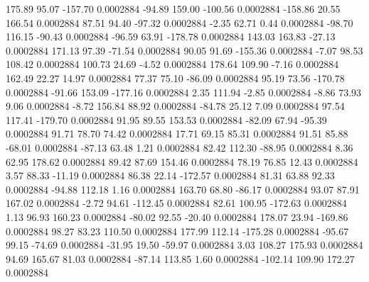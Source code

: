       175.89       95.07     -157.70     0.0002884
      -94.89      159.00     -100.56     0.0002884
     -158.86       20.55      166.54     0.0002884
       87.51       94.40      -97.32     0.0002884
       -2.35       62.71        0.44     0.0002884
      -98.70      116.15      -90.43     0.0002884
      -96.59       63.91     -178.78     0.0002884
      143.03      163.83      -27.13     0.0002884
      171.13       97.39      -71.54     0.0002884
       90.05       91.69     -155.36     0.0002884
       -7.07       98.53      108.42     0.0002884
      100.73       24.69       -4.52     0.0002884
      178.64      109.90       -7.16     0.0002884
      162.49       22.27       14.97     0.0002884
       77.37       75.10      -86.09     0.0002884
       95.19       73.56     -170.78     0.0002884
      -91.66      153.09     -177.16     0.0002884
        2.35      111.94       -2.85     0.0002884
       -8.86       73.93        9.06     0.0002884
       -8.72      156.84       88.92     0.0002884
      -84.78       25.12        7.09     0.0002884
       97.54      117.41     -179.70     0.0002884
       91.95       89.55      153.53     0.0002884
      -82.09       67.94      -95.39     0.0002884
       91.71       78.70       74.42     0.0002884
       17.71       69.15       85.31     0.0002884
       91.51       85.88      -68.01     0.0002884
      -87.13       63.48        1.21     0.0002884
       82.42      112.30      -88.95     0.0002884
        8.36       62.95      178.62     0.0002884
       89.42       87.69      154.46     0.0002884
       78.19       76.85       12.43     0.0002884
        3.57       88.33      -11.19     0.0002884
       86.38       22.14     -172.57     0.0002884
       81.31       63.88       92.33     0.0002884
      -94.88      112.18        1.16     0.0002884
      163.70       68.80      -86.17     0.0002884
       93.07       87.91      167.02     0.0002884
       -2.72       94.61     -112.45     0.0002884
       82.61      100.95     -172.63     0.0002884
        1.13       96.93      160.23     0.0002884
      -80.02       92.55      -20.40     0.0002884
      178.07       23.94     -169.86     0.0002884
       98.27       83.23      110.50     0.0002884
      177.99      112.14     -175.28     0.0002884
      -95.67       99.15      -74.69     0.0002884
      -31.95       19.50      -59.97     0.0002884
        3.03      108.27      175.93     0.0002884
       94.69      165.67       81.03     0.0002884
      -87.14      113.85        1.60     0.0002884
     -102.14      109.90      172.27     0.0002884
